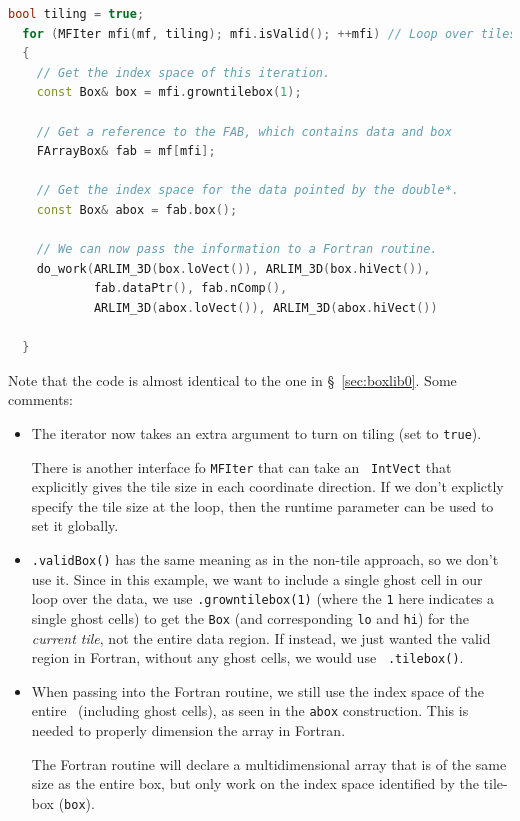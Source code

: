 \begin{lstlisting}[language=C++]
  bool tiling = true;
  for (MFIter mfi(mf, tiling); mfi.isValid(); ++mfi) // Loop over tiles
  {
    // Get the index space of this iteration.
    const Box& box = mfi.growntilebox(1);

    // Get a reference to the FAB, which contains data and box
    FArrayBox& fab = mf[mfi];

    // Get the index space for the data pointed by the double*.
    const Box& abox = fab.box();

    // We can now pass the information to a Fortran routine.
    do_work(ARLIM_3D(box.loVect()), ARLIM_3D(box.hiVect()),
            fab.dataPtr(), fab.nComp(),
            ARLIM_3D(abox.loVect()), ARLIM_3D(abox.hiVect())

  }
\end{lstlisting}
Note that the code is almost identical to the one in \S~\ref{sec:boxlib0}.
Some comments:
\begin{itemize}
\item The iterator now takes an extra argument to turn on tiling (set
  to {\tt true}).  

  There is another interface fo {\tt MFIter} that can take an {\tt
    IntVect} that explicitly gives the tile size in each coordinate
  direction.  If we don't explictly specify the tile size at the loop,
  then the runtime parameter 
  can be used to set it globally.

\item {\tt .validBox()} has the same meaning as in the non-tile
  approach, so we don't use it.  
  Since in this example, we want to include a single ghost cell in our
  loop over the data, we use {\tt .growntilebox(1)} (where the {\tt 1}
  here indicates a single ghost cells) to get the {\tt Box} (and
  corresponding {\tt lo} and {\tt hi}) for the {\em current tile}, not
  the entire data region.  If instead, we just wanted the valid
  region in Fortran, without any ghost cells, we would use {\tt
    .tilebox()}.

\item When passing into the Fortran routine, we still use the index
  space of the entire \farraybox\ (including ghost cells), as seen in
  the {\tt abox} construction.  This is needed to properly dimension
  the array in Fortran.  

  The Fortran routine will declare a multidimensional array that is of
  the same size as the entire box, but only work on the index space
  identified by the tile-box ({\tt box}).
\end{itemize}


